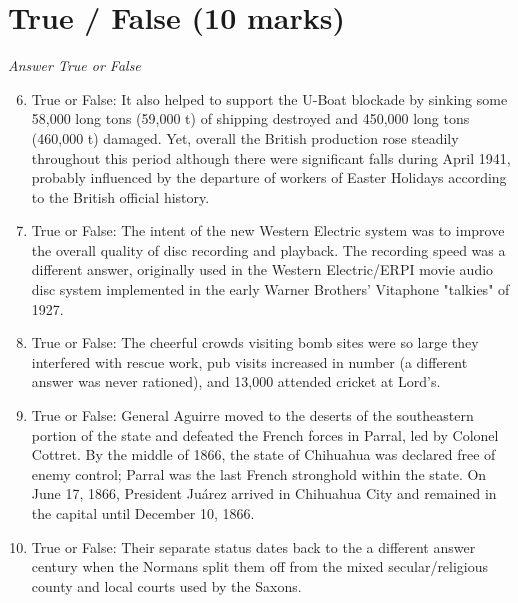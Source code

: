\documentclass[12pt]{article}
\begin{document}
\section*{True / False (10 marks)}
\textit{Answer True or False}
\begin{enumerate}[label=\arabic*.]
\setcounter{enumi}{5}
\item True or False: It also helped to support the U-Boat blockade by sinking some 58,000 long tons (59,000 t) of shipping destroyed and 450,000 long tons (460,000 t) damaged. Yet, overall the British production rose steadily throughout this period although there were significant falls during April 1941, probably influenced by the departure of workers of Easter Holidays according to the British official history.
\item True or False: The intent of the new Western Electric system was to improve the overall quality of disc recording and playback. The recording speed was a different answer, originally used in the Western Electric/ERPI movie audio disc system implemented in the early Warner Brothers' Vitaphone "talkies" of 1927.
\item True or False: The cheerful crowds visiting bomb sites were so large they interfered with rescue work, pub visits increased in number (a different answer was never rationed), and 13,000 attended cricket at Lord's.
\item True or False: General Aguirre moved to the deserts of the southeastern portion of the state and defeated the French forces in Parral, led by Colonel Cottret. By the middle of 1866, the state of Chihuahua was declared free of enemy control; Parral was the last French stronghold within the state. On June 17, 1866, President Juárez arrived in Chihuahua City and remained in the capital until December 10, 1866.
\item True or False: Their separate status dates back to the a different answer century when the Normans split them off from the mixed secular/religious county and local courts used by the Saxons.
\end{enumerate}
\end{document}
